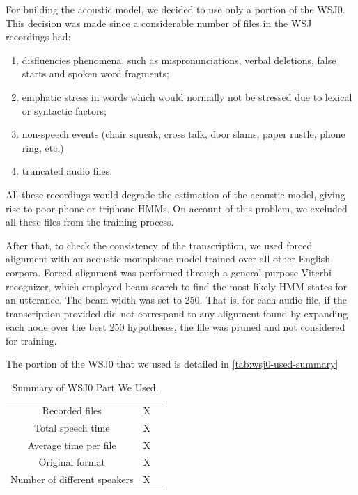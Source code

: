 For building the acoustic model, we decided to use only a portion of the WSJ0. This decision was made 
since a considerable number of files in the WSJ recordings had:

\begin{enumerate}
 \item disfluencies phenomena, such as mispronunciations, verbal deletions, false starts and spoken word fragments; 
 \item emphatic stress in words which would normally not be stressed due to lexical or syntactic factors;
 \item non-speech events (chair squeak, cross talk, door slams, paper rustle, phone ring, etc.)
 \item truncated audio files.
\end{enumerate}

All these recordings would degrade the estimation of the acoustic model, giving rise to poor phone or 
triphone \ac{HMM}s. On account of this problem, we excluded all these files from the training process.

After that, to check the consistency of the transcription, we used forced alignment with an acoustic
monophone model trained over all other English corpora. Forced alignment was performed through 
a general-purpose Viterbi recognizer, which employed beam search to find the most likely \ac{HMM} states 
for an utterance. The beam-width was set to 250. That is, for each audio file, if the transcription provided 
did not correspond to any alignment found by expanding each node over the best 250 hypotheses, 
the file was pruned and not considered for training.




The portion of the WSJ0 that we used is detailed in \autoref{tab:wsj0-used-summary}

\begin{table}[H]
\caption[Summary of WSJ0 Part We Used.]{Summary of WSJ0 Part We Used.}
\smallskip
\centering
\begin{tabular}{ccc} \toprule
 Recorded files & X \\
 Total speech time & X \\
 Average time per file & X \\
 Original format & X \\
 Number of different speakers & X \\
 \bottomrule
\end{tabular}
\label{tab:wsj0-used-summary}
\end{table}

